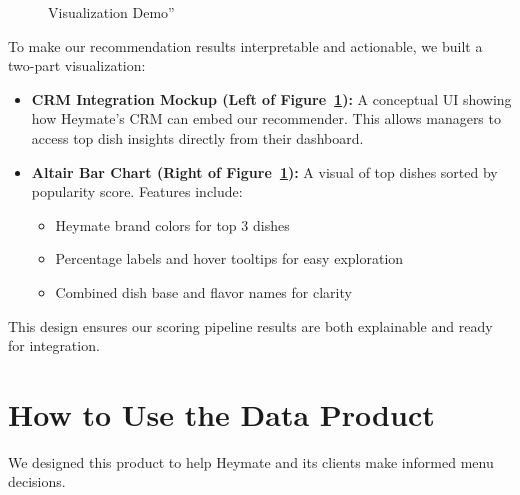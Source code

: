 \documentclass[
  11pt,
  a4paper,
  DIV=11,
  numbers=noendperiod]{scrartcl}
\providecommand{\tightlist}{%
  \setlength{\itemsep}{0pt}\setlength{\parskip}{0pt}}\usepackage{longtable,booktabs,array}
\begin{document}
\begin{figure}

\caption{\label{fig-viz-demo}Visualization Demo''}


\end{figure}%

To make our recommendation results interpretable and actionable, we
built a two-part visualization:

\begin{itemize}
\tightlist
\item
  \textbf{CRM Integration Mockup (Left of Figure~\ref{fig-viz-demo}):} A
  conceptual UI showing how Heymate's CRM can embed our recommender.
  This allows managers to access top dish insights directly from their
  dashboard.
\item
  \textbf{Altair Bar Chart (Right of Figure~\ref{fig-viz-demo}):} A
  visual of top dishes sorted by popularity score. Features include:

  \begin{itemize}
  \tightlist
  \item
    Heymate brand colors for top 3 dishes
  \item
    Percentage labels and hover tooltips for easy exploration
  \item
    Combined dish base and flavor names for clarity
  \end{itemize}
\end{itemize}

This design ensures our scoring pipeline results are both explainable
and ready for integration.

\section{How to Use the Data Product}\label{how-to-use-the-data-product}

We designed this product to help Heymate and its clients make informed
menu decisions.
\end{document}
